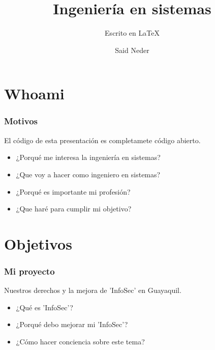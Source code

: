 \documentclass{beamer}
\title{Ingeniería en sistemas}
\author{Said Neder}
\subtitle{Escrito en \LaTeX}
\institute[\href{https://www.soler.edu.ec/}{Soler Lux Dei}]{Soler Lux Dei\\ \href{https://gist.github.com/crazyc4t/b9d600b489b931cb378a59646cb872b1}{\tiny https://gist.github.com/crazyc4t/b9d600b489b931cb378a59646cb872b1}}
\begin{document}
\maketitle

\section{Whoami}

\begin{frame}
\frametitle{Motivos}

El código de esta presentación es completamete código abierto.

\begin{itemize}
\item ¿Porqué me interesa la ingeniería en sistemas?
\item ¿Que voy a hacer como ingeniero en sistemas?
\item ¿Porqué es importante mi profesión?
\item ¿Que haré para cumplir mi objetivo?
\end{itemize}

\end{frame}

\section{Objetivos}

\begin{frame}
\frametitle{Mi proyecto}

Nuestros derechos y la mejora de 'InfoSec' en Guayaquil.\\

\begin{itemize}
\item ¿Qué es 'InfoSec'?
\item ¿Porqué debo mejorar mi 'InfoSec'?
\item ¿Cómo hacer conciencia sobre este tema?
\end{itemize}

\end{frame}
\end{document}
